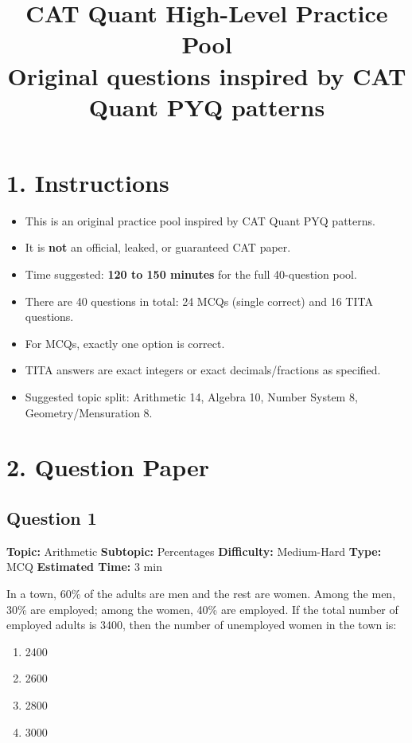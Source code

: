 \documentclass[11pt]{article}
\title{\textbf{CAT Quant High-Level Practice Pool}\\[4pt]\large Original questions inspired by CAT Quant PYQ patterns}
\author{}
\date{}
\begin{document}
\maketitle

\section*{1. Instructions}

\begin{itemize}[leftmargin=1.2em]
\item This is an original practice pool inspired by CAT Quant PYQ patterns.
\item It is \textbf{not} an official, leaked, or guaranteed CAT paper.
\item Time suggested: \textbf{120 to 150 minutes} for the full 40-question pool.
\item There are 40 questions in total: 24 MCQs (single correct) and 16 TITA questions.
\item For MCQs, exactly one option is correct.
\item TITA answers are exact integers or exact decimals/fractions as specified.
\item Suggested topic split: Arithmetic 14, Algebra 10, Number System 8, Geometry/Mensuration 8.
\end{itemize}

\newpage
\section*{2. Question Paper}

\subsection*{Question 1}
\textbf{Topic:} Arithmetic \quad \textbf{Subtopic:} Percentages \quad \textbf{Difficulty:} Medium-Hard \quad \textbf{Type:} MCQ \quad \textbf{Estimated Time:} 3 min

\begin{tcolorbox}
In a town, 60\% of the adults are men and the rest are women. Among the men, 30\% are employed; among the women, 40\% are employed. If the total number of employed adults is 3400, then the number of unemployed women in the town is:
\end{tcolorbox}
\begin{enumerate}[label=(\Alph*)]
\item 2400
\item 2600
\item 2800
\item 3000
\end{enumerate}
\end{document}
